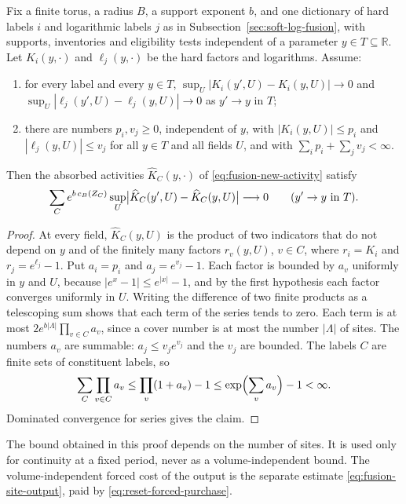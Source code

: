\begin{lemma}
\label{lem:reset-absorption-continuity}
Fix a finite torus, a radius $B$, a support exponent $b$, and one
dictionary of hard labels $i$ and logarithmic labels $j$ as in
Subsection~\ref{sec:soft-log-fusion}, with supports, inventories and
eligibility tests independent of a parameter $y\in T\subseteq
\mathbb R$. Let $K_i(y,\cdot)$ and $\ell_j(y,\cdot)$ be the hard
factors and logarithms. Assume:
\begin{enumerate}
\item for every label and every $y\in T$,
 $\sup_U|K_i(y',U)-K_i(y,U)|\to0$ and
 $\sup_U|\ell_j(y',U)-\ell_j(y,U)|\to0$ as $y'\to y$ in $T$;
\item there are numbers $p_i,v_j\ge0$, independent of $y$, with
 $|K_i(y,U)|\le p_i$ and $|\ell_j(y,U)|\le v_j$ for all $y\in T$ and
 all fields $U$, and with $\sum_ip_i+\sum_jv_j<\infty$.
\end{enumerate}
Then the absorbed activities $\widehat K_C(y,\cdot)$ of
\eqref{eq:fusion-new-activity} satisfy
\[
 \sum_Ce^{b\,c_B(Z_C)}\sup_U
 \bigl|\widehat K_C(y',U)-\widehat K_C(y,U)\bigr|\longrightarrow0
 \qquad(y'\to y\ \hbox{in }T).
\]
\end{lemma}
\begin{proof}
At every field, $\widehat K_C(y,U)$ is the product of two indicators
that do not depend on $y$ and of the finitely many factors
$r_v(y,U)$, $v\in C$, where $r_i=K_i$ and $r_j=e^{\ell_j}-1$.
Put $a_i=p_i$ and $a_j=e^{v_j}-1$. Each factor is bounded by $a_v$
uniformly in $y$ and $U$, because $|e^x-1|\le e^{|x|}-1$, and by the
first hypothesis each factor converges uniformly in $U$. Writing the
difference of two finite products as a telescoping sum shows that
each term of the series tends to zero. Each term is at most
$2e^{b|\Lambda|}\prod_{v\in C}a_v$, since a cover number is at most
the number $|\Lambda|$ of sites. The numbers $a_v$ are summable:
$a_j\le v_je^{v_j}$ and the $v_j$ are bounded. The labels $C$ are
finite sets of constituent labels, so
\[
 \sum_C\prod_{v\in C}a_v\le\prod_v(1+a_v)-1
                       \le\exp\Bigl(\sum_va_v\Bigr)-1<\infty .
\]
Dominated convergence for series gives the claim.
\end{proof}

The bound obtained in this proof depends on the number of sites. It
is used only for continuity at a fixed period, never as a
volume-independent bound. The volume-independent forced cost of the
output is the separate estimate \eqref{eq:fusion-site-output}, paid
by \eqref{eq:reset-forced-purchase}.

